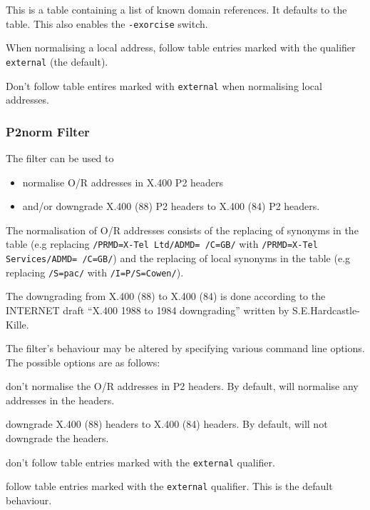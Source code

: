 \begin{describe}
\item[\verb|-valid\_domains table|:] This is a table containing a list
of known domain references. It defaults to the  table.
This also enables the \verb|-exorcise| switch.

\item[\verb|-external|:] When normalising a local address, follow
 table entries marked with 
the qualifier \verb|external| (the default).

\item[\verb|-internal|:] Don't follow  table entires
marked with \verb|external| when normalising local addresses.

\end{describe}

\subsubsection {P2norm Filter}

The filter  can be used to
\begin{itemize}
\item normalise O/R addresses in X.400 P2 headers 
\item and/or downgrade X.400 (88) P2 headers to X.400 (84) P2
headers.
\end{itemize}

The normalisation of O/R addresses consists of the replacing of
synonyms in the  table (e.g replacing
\verb+/PRMD=X-Tel Ltd/ADMD= /C=GB/+ with
\verb+/PRMD=X-Tel Services/ADMD= /C=GB/+) and the replacing of
local synonyms in the  table (e.g replacing
\verb+/S=pac/+ with \verb+/I=P/S=Cowen/+).

The downgrading from X.400 (88) to X.400 (84) is done according to the
INTERNET draft ``X.400 1988 to 1984 downgrading'' written by
S.E.Hardcastle-Kille.

The  filter's behaviour may be altered by specifying
various command line options.
The possible options are as follows:
\begin{describe}
\item[\verb+-nonorm+:] don't normalise the O/R addresses in
P2 headers. By default,  will normalise any addresses in
the headers.
\item[\verb+-downgrade+:] downgrade X.400 (88) headers to X.400 (84)
headers.
By default,  will not downgrade the headers.
\item[\verb+-internal+:] don't follow  table entries
marked with the \verb+external+ qualifier.
\item[\verb+-external+:] follow  table entries marked
with the \verb+external+ qualifier. This is the default behaviour.
\end{describe}

